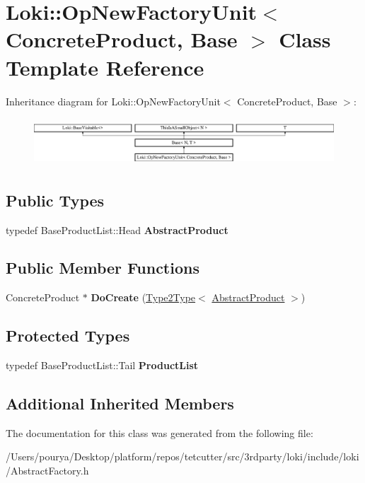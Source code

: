 \hypertarget{classLoki_1_1OpNewFactoryUnit}{}\section{Loki\+:\+:Op\+New\+Factory\+Unit$<$ Concrete\+Product, Base $>$ Class Template Reference}
\label{classLoki_1_1OpNewFactoryUnit}
Inheritance diagram for Loki\+:\+:Op\+New\+Factory\+Unit$<$ Concrete\+Product, Base $>$\+:\begin{figure}[H]
\begin{center}
\leavevmode
\includegraphics[height=1.789137cm]{classLoki_1_1OpNewFactoryUnit}
\end{center}
\end{figure}
\subsection*{Public Types}
\begin{DoxyCompactItemize}
\item 
\hypertarget{classLoki_1_1OpNewFactoryUnit_a215f706251fe2c15c5b400ab32a0aa47}{}typedef Base\+Product\+List\+::\+Head {\bfseries Abstract\+Product}\label{classLoki_1_1OpNewFactoryUnit_a215f706251fe2c15c5b400ab32a0aa47}

\end{DoxyCompactItemize}
\subsection*{Public Member Functions}
\begin{DoxyCompactItemize}
\item 
\hypertarget{classLoki_1_1OpNewFactoryUnit_a6360ccfac2ae48378030729ecc220192}{}Concrete\+Product $\ast$ {\bfseries Do\+Create} (\hyperlink{structLoki_1_1Type2Type}{Type2\+Type}$<$ \hyperlink{classAbstractProduct}{Abstract\+Product} $>$)\label{classLoki_1_1OpNewFactoryUnit_a6360ccfac2ae48378030729ecc220192}

\end{DoxyCompactItemize}
\subsection*{Protected Types}
\begin{DoxyCompactItemize}
\item 
\hypertarget{classLoki_1_1OpNewFactoryUnit_ae6b4e1dba2211be1b23afaf9dfb5aac7}{}typedef Base\+Product\+List\+::\+Tail {\bfseries Product\+List}\label{classLoki_1_1OpNewFactoryUnit_ae6b4e1dba2211be1b23afaf9dfb5aac7}

\end{DoxyCompactItemize}
\subsection*{Additional Inherited Members}


The documentation for this class was generated from the following file\+:\begin{DoxyCompactItemize}
\item 
/\+Users/pourya/\+Desktop/platform/repos/tetcutter/src/3rdparty/loki/include/loki/Abstract\+Factory.\+h\end{DoxyCompactItemize}
